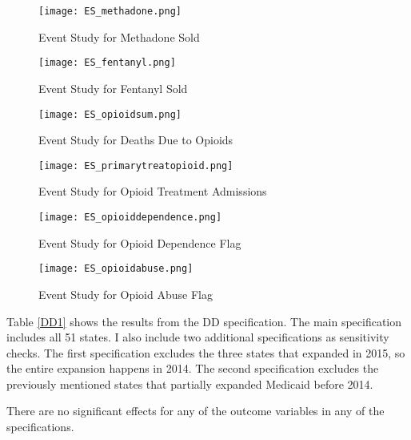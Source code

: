 \documentclass[11pt]{article}
\begin{document}
\begin{figure} 
  \texttt{[image: ES\_methadone.png]}
  \caption{Event Study for Methadone Sold}
  \label{ES_Methadone}
\end{figure}

\begin{figure} 
  \texttt{[image: ES\_fentanyl.png]}
  \caption{Event Study for Fentanyl Sold}
  \label{ES_Fenanyl}
\end{figure}

\begin{figure} 
  \texttt{[image: ES\_opioidsum.png]}
  \caption{Event Study for Deaths Due to Opioids}
  \label{ES_Deaths}
\end{figure}

\begin{figure} 
  \texttt{[image: ES\_primarytreatopioid.png]}
  \caption{Event Study for Opioid Treatment Admissions}
  \label{ES_primary}
\end{figure}

\begin{figure} 
  \texttt{[image: ES\_opioiddependence.png]}
  \caption{Event Study for Opioid Dependence Flag}
  \label{ES_dependence}
\end{figure}


\begin{figure} 
  \texttt{[image: ES\_opioidabuse.png]}
  \caption{Event Study for Opioid Abuse Flag}
  \label{ES_abuse}
\end{figure}
 \clearpage
 
 
 Table \ref{DD1} shows the results from the DD specification.  The main specification includes all 51 states.  I also include two additional specifications as sensitivity checks.  The first specification excludes the three states that expanded in 2015, so the entire expansion happens in 2014.  The second specification excludes the previously mentioned states that partially expanded Medicaid before 2014.  
 
There are no significant effects for any of the outcome variables in any of the specifications.
 
\end{document}
